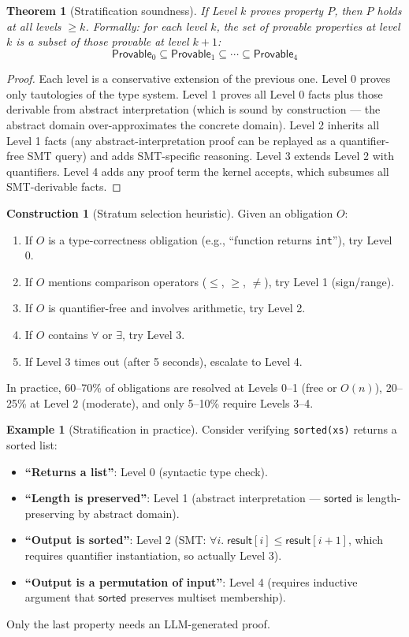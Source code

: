 \documentclass[11pt,a4paper]{report}
\theoremstyle{definition}
\newtheorem{example}[definition]{Example}
\newtheorem{construction}[definition]{Construction}
\theoremstyle{plain}
\newtheorem{theorem}[definition]{Theorem}
\begin{document}
\begin{theorem}[Stratification soundness]
If Level $k$ proves property $P$, then $P$ holds at all levels $\geq k$.
Formally: for each level $k$, the set of provable properties at level $k$
is a subset of those provable at level $k+1$:
\[
  \mathsf{Provable}_0 \subseteq \mathsf{Provable}_1 \subseteq \cdots \subseteq \mathsf{Provable}_4
\]
\end{theorem}
\begin{proof}
Each level is a conservative extension of the previous one.  Level 0 proves only
tautologies of the type system.  Level 1 proves all Level 0 facts plus those
derivable from abstract interpretation (which is sound by construction --- the
abstract domain over-approximates the concrete domain).  Level 2 inherits all
Level 1 facts (any abstract-interpretation proof can be replayed as a quantifier-free
SMT query) and adds SMT-specific reasoning.  Level 3 extends Level 2 with quantifiers.
Level 4 adds any proof term the kernel accepts, which subsumes all SMT-derivable facts.
\end{proof}

\begin{construction}[Stratum selection heuristic]
Given an obligation $O$:
\begin{enumerate}
  \item If $O$ is a type-correctness obligation (e.g., ``function returns \lstinline[style=python]{int}''),
    try Level 0.
  \item If $O$ mentions comparison operators ($\leq$, $\geq$, $\neq$), try Level 1 (sign/range).
  \item If $O$ is quantifier-free and involves arithmetic, try Level 2.
  \item If $O$ contains $\forall$ or $\exists$, try Level 3.
  \item If Level 3 times out (after 5 seconds), escalate to Level 4.
\end{enumerate}
In practice, 60--70\% of obligations are resolved at Levels 0--1 (free or $O(n)$),
20--25\% at Level 2 (moderate), and only 5--10\% require Levels 3--4.
\end{construction}

\begin{example}[Stratification in practice]
Consider verifying \lstinline[style=python]{sorted(xs)} returns a sorted list:
\begin{itemize}
  \item \textbf{``Returns a list''}: Level 0 (syntactic type check).
  \item \textbf{``Length is preserved''}: Level 1 (abstract interpretation ---
    $\mathsf{sorted}$ is length-preserving by abstract domain).
  \item \textbf{``Output is sorted''}: Level 2 (SMT: $\forall i.\; \mathsf{result}[i] \leq \mathsf{result}[i+1]$,
    which requires quantifier instantiation, so actually Level 3).
  \item \textbf{``Output is a permutation of input''}: Level 4 (requires inductive
    argument that $\mathsf{sorted}$ preserves multiset membership).
\end{itemize}
Only the last property needs an LLM-generated proof.
\end{example}
\end{document}
